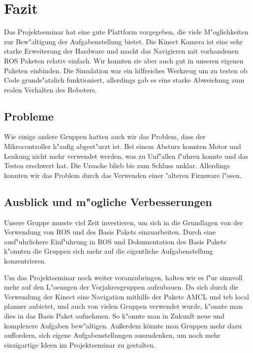 \section{Fazit}

Das Projektseminar hat eine gute Plattform vorgegeben, die viele M"oglichkeiten zur Bew"altigung der Aufgabenstellung 
bietet. Die Kinect Kamera ist eine sehr
starke Erweiterung der Hardware und macht das Navigieren mit vorhandenen ROS Paketen relativ einfach.
Wir konnten sie aber auch gut in unseren eigenen Paketen einbinden. Die Simulation war ein hilfreiches Werkzeug um zu testen ob Code grunds"atzlich funktioniert, allerdings gab es eine starke Abweichung zum realen Verhalten des Roboters.		

 

\subsection{Probleme}

Wie einige andere Gruppen hatten auch wir das Problem, dass der Mikrocontroller h"aufig abgest"urzt ist. Bei einem Absturz konnten Motor und Lenkung nicht mehr verwendet werden, was zu Unf"allen f"uhren konnte und das Testen erschwert hat.
Die Ursache blieb bis zum Schluss unklar. Allerdings konnten wir das Problem durch das Verwenden einer "alteren Firmware l"osen.



\subsection{Ausblick und m"ogliche Verbesserungen}

Unsere Gruppe musste viel Zeit investieren, um sich in die Grundlagen von der Verwendung von ROS und des Basis Pakets einzuarbeiten. 
Durch eine ausf"uhrlichere Einf"uhrung in ROS und Dokumentation des Basis Pakets k"onnten die Gruppen sich mehr auf die eigentliche Aufgabenstellung
konzentrieren.

Um das Projektseminar noch weiter voranzubringen, halten wir es f"ur sinnvoll mehr auf den L"osungen der Vorjahresgruppen aufzubauen.
Da sich durch die Verwendung der Kinect eine Navigation mithilfe der Pakete AMCL und teb local planner anbietet, und auch von vielen Gruppen verwendet wurde,
k"onnte man dies in das Basis Paket aufnehmen. So k"onnte man in Zukunft neue und komplexere Aufgaben bew"altigen.
Au{\ss}erdem könnte man Gruppen mehr dazu auffordern, sich eigene Aufgabenstellungen auszudenken, um noch mehr einzigartige Ideen im Projektseminar zu gestalten.
